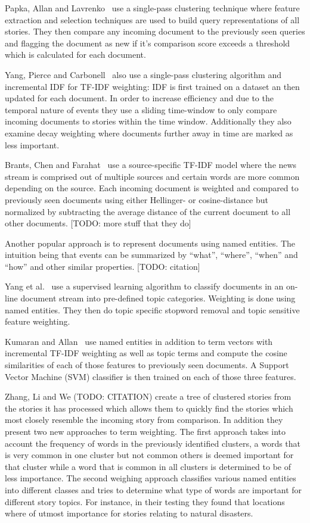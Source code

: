 Papka, Allan and Lavrenko~\cite{papka1998online} use a single-pass clustering technique where feature extraction and selection techniques are used to build query representations of all stories. They then compare any incoming document to the previously seen queries and flagging the document as new if it's comparison score exceeds a threshold which is calculated for each document.

Yang, Pierce and Carbonell~\cite{yang1998study} also use a single-pass clustering algorithm and incremental IDF for TF-IDF weighting: IDF is first trained on a dataset an then updated for each document. In order to increase efficiency and due to the temporal nature of events they use a sliding time-window to only compare incoming documents to stories within the time window. Additionally they also examine decay weighting where documents further away in time are marked as less important.

Brants, Chen and Farahat~\cite{brants2003system} use a source-specific TF-IDF model where the news stream is comprised out of multiple sources and certain words are more common depending on the source. Each incoming document is weighted and compared to previously seen documents using either Hellinger- or cosine-distance but normalized by subtracting the average distance of the current document to all other documents. [TODO: more stuff that they do]

Another popular approach is to represent documents using named entities. The intuition being that events can be summarized  by ``what'', ``where'', ``when'' and ``how'' and other similar properties. [TODO: citation]

Yang et al.~\cite{yang2002topic} use a supervised learning algorithm to classify documents in an on-line document stream into pre-defined topic categories. Weighting is done using named entities. They then do topic specific stopword removal and topic sensitive feature weighting.

Kumaran and Allan~\cite{kumaran2005using} use named entities in addition to term vectors with incremental TF-IDF weighting as well as topic terms and compute the cosine similarities of each of those features to previously seen documents. A Support Vector Machine (SVM) classifier is then trained on each of those three features.

Zhang, Li and We (TODO: CITATION) create a tree of clustered stories from the stories it has processed which allows them to quickly find the stories which most closely resemble the incoming story from comparison. In addition they present two new approaches to term weighting. The first approach takes into account the frequency of words in the previously identified clusters, a words that is very common in one cluster but not common others is deemed important for that cluster while a word that is common in all clusters is determined to be of less importance. The second weighing approach classifies various named entities into different classes and tries to determine what type of words are important for different story topics. For instance, in their testing they found that locations where of utmost importance for stories relating to natural disasters.

